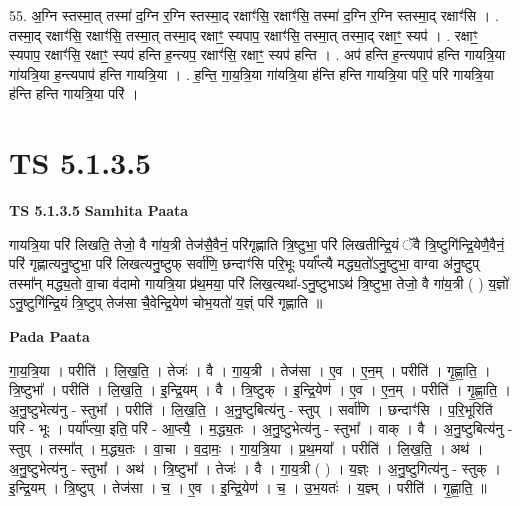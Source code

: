 \documentclass[17pt]{extarticle}
\begin{document}
55. अ॒ग्नि स्तस्मा॒त् तस्मा॑ द॒ग्नि र॒ग्नि स्तस्मा॒द् रक्षाꣳ॑सि॒ रक्षाꣳ॑सि॒ तस्मा॑ द॒ग्नि र॒ग्नि स्तस्मा॒द् रक्षाꣳ॑सि । . तस्मा॒द् रक्षाꣳ॑सि॒ रक्षाꣳ॑सि॒ तस्मा॒त् तस्मा॒द् रक्षाꣳ॒॒ स्यपाप॒ रक्षाꣳ॑सि॒ तस्मा॒त् तस्मा॒द् रक्षाꣳ॒॒ स्यप॑ । . रक्षाꣳ॒॒ स्यपाप॒ रक्षाꣳ॑सि॒ रक्षाꣳ॒॒ स्यप॑ हन्ति ह॒न्त्यप॒ रक्षाꣳ॑सि॒ रक्षाꣳ॒॒ स्यप॑ हन्ति । . अप॑ हन्ति ह॒न्त्यपाप॑ हन्ति गायत्रि॒या गा॑यत्रि॒या ह॒न्त्यपाप॑ हन्ति गायत्रि॒या । . ह॒न्ति॒ गा॒य॒त्रि॒या गा॑यत्रि॒या ह॑न्ति हन्ति गायत्रि॒या परि॒ परि॑ गायत्रि॒या ह॑न्ति हन्ति गायत्रि॒या परि॑ । \newline
\pagebreak
{}

\section{ TS 5.1.3.5 }

\textbf{TS 5.1.3.5 } \newline
\textbf{Samhita Paata} \newline

गायत्रि॒या परि॑ लिखति॒ तेजो॒ वै गा॑य॒त्री तेज॑सै॒वैनं॒ परि॑गृह्णाति त्रि॒ष्टुभा॒ परि॑ लिखतीन्द्रि॒यं ॅवै त्रि॒ष्टुगि॑न्द्रि॒येणै॒वैनं॒ परि॑ गृह्णात्यनु॒ष्टुभा॒ परि॑ लिखत्यनु॒ष्टुफ् सर्वा॑णि॒ छन्दाꣳ॑सि परि॒भूः पर्या᳚प्त्यै मद्ध्य॒तो॑ऽनु॒ष्टुभा॒ वाग्वा अ॑नु॒ष्टुप् तस्मा᳚न् मद्ध्य॒तो वा॒चा व॑दामो गायत्रि॒या प्र॑थ॒मया॒ परि॑ लिख॒त्यथा॑-ऽनु॒ष्टुभाऽथ॑ त्रि॒ष्टुभा॒ तेजो॒ वै गा॑य॒त्री ( ) य॒ज्ञो॑ ऽनु॒ष्टुगि॑न्द्रि॒यं त्रि॒ष्टुप् तेज॑सा चै॒वेन्द्रि॒येण॑ चोभ॒यतो॑ य॒ज्ञ्ं परि॑ गृह्णाति ॥ \newline

\textbf{Pada Paata} \newline

गा॒य॒त्रि॒या । परीति॑ । लि॒ख॒ति॒ । तेजः॑ । वै । गा॒य॒त्री । तेज॑सा । ए॒व । ए॒न॒म् । परीति॑ । गृ॒ह्णा॒ति॒ । त्रि॒ष्टुभा᳚ । परीति॑ । लि॒ख॒ति॒ । इ॒न्द्रि॒यम् । वै । त्रि॒ष्टुक् । इ॒न्द्रि॒येण॑ । ए॒व । ए॒न॒म् । परीति॑ । गृ॒ह्णा॒ति॒ । अ॒नु॒ष्टुभेत्य॑नु - स्तुभा᳚ । परीति॑ । लि॒ख॒ति॒ । अ॒नु॒ष्टुबित्य॑नु - स्तुप् । सर्वा॑णि । छन्दाꣳ॑सि । प॒रि॒भूरिति॑ परि - भूः । पर्या᳚प्त्या॒ इति॒ परि॑ - आ॒प्त्यै॒ । म॒द्ध्य॒तः । अ॒नु॒ष्टुभेत्य॑नु - स्तुभा᳚ । वाक् । वै । अ॒नु॒ष्टुबित्य॑नु - स्तुप् । तस्मा᳚त् । म॒द्ध्य॒तः । वा॒चा । व॒दा॒मः॒ । गा॒य॒त्रि॒या । प्र॒थ॒मया᳚ । परीति॑ । लि॒ख॒ति॒ । अथ॑ । अ॒नु॒ष्टुभेत्य॑नु - स्तुभा᳚ । अथ॑ । त्रि॒ष्टुभा᳚ । तेजः॑ । वै । गा॒य॒त्री ( ) । य॒ज्ञ्ः । अ॒नु॒ष्टुगित्य॑नु - स्तुक् । इ॒न्द्रि॒यम् । त्रि॒ष्टुप् । तेज॑सा । च॒ । ए॒व । इ॒न्द्रि॒येण॑ । च॒ । उ॒भ॒यतः॑ । य॒ज्ञ्म् । परीति॑ । गृ॒ह्णा॒ति॒ ॥  \newline
\end{document}
